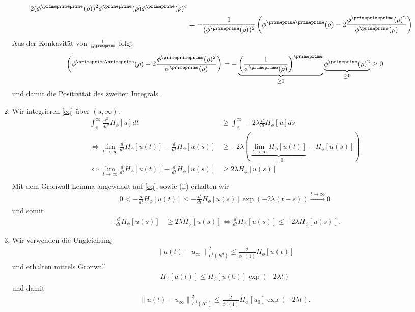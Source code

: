 \begin{solution}
\begin{enumerate}[label = (\roman*)]
\begin{align*}
{  2(\phi^{\primeprimeprime}(\rho))^2\phi^{\primeprime}(\rho)}{\phi^{\primeprime}(\rho)^4} \\
  &= -\frac{1}{(\phi^{\primeprime}(\rho))^2}
  \left(\phi^{\primeprime\primeprime}(\rho) -
  2\frac{\phi^{\primeprimeprime}(\rho)^2}{\phi^{\primeprime}(\rho)}\right)
  \end{align*}
  Aus der Konkavität von $\frac{1}{\phi^{\primeprime}}$ folgt
  \begin{align*}
  \left(\phi^{\primeprime\primeprime}(\rho) -
  2\frac{\phi^{\primeprimeprime}(\rho)^2}{\phi^{\primeprime}(\rho)}\right) =
  -\underbrace{\left(\frac{1}{\phi^{\primeprime}(\rho)}\right)^{\primeprime}}
  _{\geq 0}\underbrace{\phi^{\primeprime}(\rho)^2}_{\geq 0} \geq 0
  \end{align*}
  und damit die Positivität des zweiten Integrals.
  \item Wir integrieren \eqref{eq} über $(s,\infty)$:
  \begin{align*}
    \int_s^{\infty}  \frac{d^{2}}{d t^{2}} H_{\phi}[u] dt &\geq
    \int_s^{\infty} -2 \lambda \frac{d}{d t} H_{\phi}[u] ds \\
    \iff \lim_{t \to \infty} \frac{d}{d t} H_{\phi}[u(t)] -\frac{d}{d t} H_{\phi}[u(s)]
    &\geq -2\lambda(\underbrace{\lim_{t \to \infty} H_{\phi}[u(t)]}_{=0} - H_{\phi}[u(s)]) \\
    \iff \lim_{t \to \infty} \frac{d}{d t} H_{\phi}[u(t)] -\frac{d}{d t} H_{\phi}[u(s)]
    &\geq 2\lambda H_{\phi}[u(s)] \\
  \end{align*}
  Mit dem Gronwall-Lemma angewandt auf \eqref{eq}, sowie (ii) erhalten wir
  \begin{align*}
    0 < -\frac{d}{d t} H_{\phi}[u(t)] \leq -\frac{d}{d t} H_{\phi}[u(s)]\exp(-2\lambda (t-s))
    \xrightarrow{t \to \infty} 0
  \end{align*}
  und somit
  \begin{align*}
  -\frac{d}{d t} H_{\phi}[u(s)]
  &\geq 2\lambda H_{\phi}[u(s)] \iff \frac{d}{d t} H_{\phi}[u(s)] \leq -2\lambda H_{\phi}[u(s)].
  \end{align*}
  \item Wir verwenden die Ungleichung
  \begin{align*}
  \left\|u(t)-u_{\infty}\right\|_{L^{1}\left(R^{d}\right)}^2
  \leq \frac{2}{\phi^{\prime \prime}(1)} H_{\phi}[u(t)]
  \end{align*}
  und erhalten mittels Gronwall
  \begin{align*}
    H_{\phi}[u(t)] \leq H_{\phi}[u(0)]\exp(-2\lambda t)
  \end{align*}
  und damit
  \begin{align*}
  \left\|u(t)-u_{\infty}\right\|_{L^{1}\left(R^{d}\right)}^2
  \leq \frac{2}{\phi^{\prime \prime}(1)} H_{\phi}[u_0]\exp(-2\lambda t).
  \end{align*}
\end{enumerate}

\end{solution}

